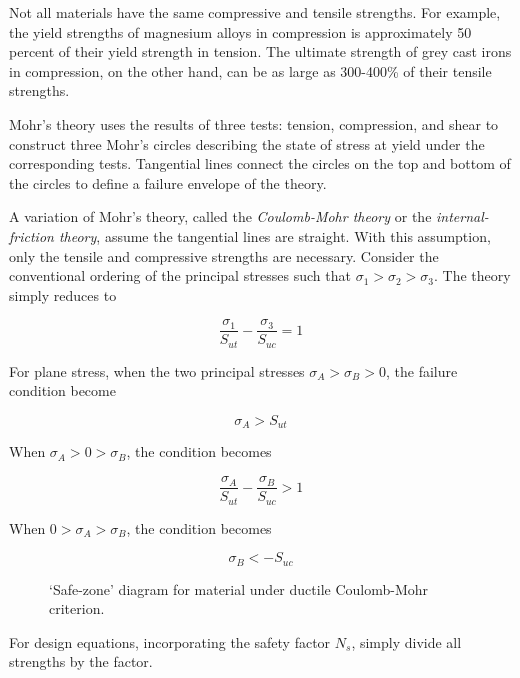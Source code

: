 \documentclass[
10pt,
a4paper,
openany,
svgnames,
]{book} %
\begin{document}
Not all materials have the same compressive and tensile strengths. For example, the yield strengths of magnesium alloys in compression is approximately 50 percent of their yield strength in tension. The ultimate strength of grey cast irons in compression, on the other hand, can be as large as 300-400\% of their tensile strengths.

Mohr’s theory uses the results of three tests: tension, compression, and shear to construct three Mohr’s circles describing the state of stress at yield under the corresponding tests. Tangential lines connect the circles on the top and bottom of the circles to define a failure envelope of the theory.

A variation of Mohr’s theory, called the \emph{Coulomb-Mohr theory} or the \emph{internal-friction theory}, assume the tangential lines are straight. With this assumption, only the tensile and compressive strengths are necessary. Consider the conventional ordering of the principal stresses such that $\sigma_1 > \sigma_2 > \sigma_3$. The theory simply reduces to 

\[\frac{\sigma_1}{S_{ut}} - \frac{\sigma_3}{S_{uc}} = 1\]

For plane stress, when the two principal stresses $\sigma_A > \sigma_B > 0$, the failure condition become

\[\sigma_A > S_{ut}\]

When  $\sigma_A > 0 > \sigma_B$, the condition becomes

\[\frac{\sigma_A}{S_{ut}} - \frac{\sigma_B}{S_{uc}} > 1\]

When  $0 > \sigma_A > \sigma_B$, the condition becomes

\[\sigma_B <  - S_{uc}\]

\begin{figure}[h]
  \centering
  \caption{`Safe-zone' diagram for material under ductile Coulomb-Mohr criterion.}
  \label{fig: Coulomb-Mohr ductile safe zone}
\end{figure}

For design equations, incorporating the safety factor $N_s$, simply divide all strengths by the factor.
\end{document}
